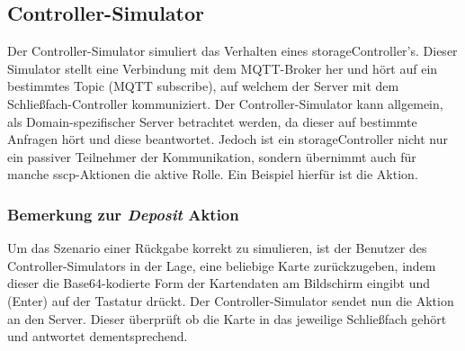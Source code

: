 
\subsection{Controller-Simulator}
Der Controller-Simulator simuliert das Verhalten eines \gls{storageController}'s. Dieser Simulator stellt eine Verbindung mit dem MQTT-Broker her und hört auf ein bestimmtes Topic (MQTT subscribe), auf welchem der Server mit dem Schließfach-Controller kommuniziert. Der Controller-Simulator kann allgemein, als Domain-spezifischer Server betrachtet werden, da dieser auf bestimmte Anfragen hört und diese beantwortet. Jedoch ist ein \gls{storageController} nicht nur ein passiver Teilnehmer der Kommunikation, sondern übernimmt auch für manche \acrshort{sscp}-Aktionen die aktive Rolle. Ein Beispiel hierfür ist die  Aktion.

\subsubsection{Bemerkung zur \textit{Deposit} Aktion}
Um das Szenario einer Rückgabe korrekt zu simulieren, ist der Benutzer des Controller-Simulators in der Lage, eine beliebige Karte zurückzugeben, indem dieser die Base64-kodierte Form der Kartendaten am Bildschirm eingibt und \keys{\return} (Enter) auf der Tastatur drückt. Der Controller-Simulator sendet nun die  Aktion an den Server. Dieser überprüft ob die Karte in das jeweilige Schließfach gehört und antwortet dementsprechend.

\newpage
